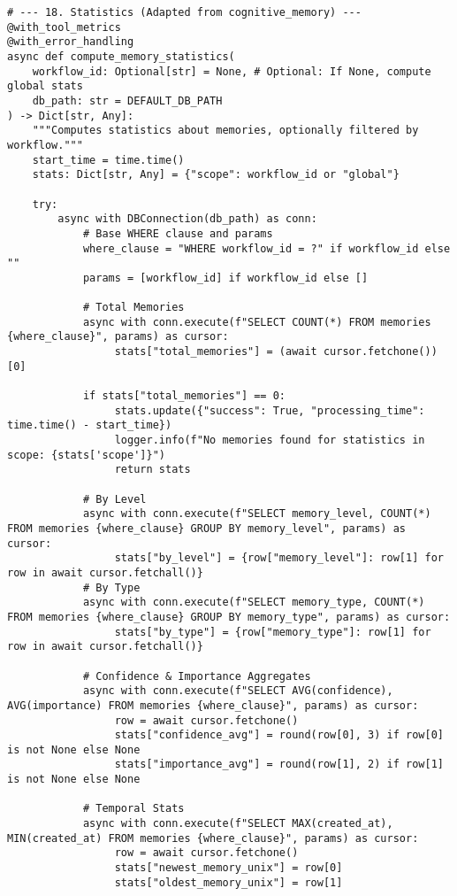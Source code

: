 \documentclass[12pt,a4paper]{article}
\begin{document}
\begin{pageablecode}
\begin{verbatim}
# --- 18. Statistics (Adapted from cognitive_memory) ---
@with_tool_metrics
@with_error_handling
async def compute_memory_statistics(
    workflow_id: Optional[str] = None, # Optional: If None, compute global stats
    db_path: str = DEFAULT_DB_PATH
) -> Dict[str, Any]:
    """Computes statistics about memories, optionally filtered by workflow."""
    start_time = time.time()
    stats: Dict[str, Any] = {"scope": workflow_id or "global"}

    try:
        async with DBConnection(db_path) as conn:
            # Base WHERE clause and params
            where_clause = "WHERE workflow_id = ?" if workflow_id else ""
            params = [workflow_id] if workflow_id else []

            # Total Memories
            async with conn.execute(f"SELECT COUNT(*) FROM memories {where_clause}", params) as cursor:
                 stats["total_memories"] = (await cursor.fetchone())[0]

            if stats["total_memories"] == 0:
                 stats.update({"success": True, "processing_time": time.time() - start_time})
                 logger.info(f"No memories found for statistics in scope: {stats['scope']}")
                 return stats

            # By Level
            async with conn.execute(f"SELECT memory_level, COUNT(*) FROM memories {where_clause} GROUP BY memory_level", params) as cursor:
                 stats["by_level"] = {row["memory_level"]: row[1] for row in await cursor.fetchall()}
            # By Type
            async with conn.execute(f"SELECT memory_type, COUNT(*) FROM memories {where_clause} GROUP BY memory_type", params) as cursor:
                 stats["by_type"] = {row["memory_type"]: row[1] for row in await cursor.fetchall()}

            # Confidence & Importance Aggregates
            async with conn.execute(f"SELECT AVG(confidence), AVG(importance) FROM memories {where_clause}", params) as cursor:
                 row = await cursor.fetchone()
                 stats["confidence_avg"] = round(row[0], 3) if row[0] is not None else None
                 stats["importance_avg"] = round(row[1], 2) if row[1] is not None else None

            # Temporal Stats
            async with conn.execute(f"SELECT MAX(created_at), MIN(created_at) FROM memories {where_clause}", params) as cursor:
                 row = await cursor.fetchone()
                 stats["newest_memory_unix"] = row[0]
                 stats["oldest_memory_unix"] = row[1]


\end{verbatim}
\end{pageablecode}
\end{document}
